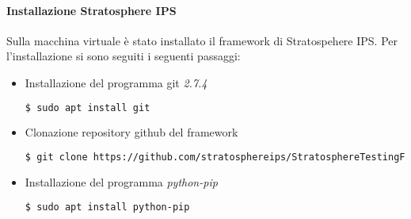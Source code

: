 \documentclass[11pt,a4paper,twoside,openright]{book}
\begin{document}
\paragraph{Installazione Stratosphere IPS}
Sulla macchina virtuale è stato installato il framework di Stratospehere IPS. Per l'installazione si sono seguiti i seguenti passaggi:

\begin{itemize}
				\item Installazione del programma git \textit{2.7.4}
\begin{lstlisting}[language=bash]
$ sudo apt install git
\end{lstlisting}

				\item Clonazione repository github del framework
\begin{lstlisting}[language=bash]
$ git clone https://github.com/stratosphereips/StratosphereTestingFramework
\end{lstlisting}

				\item Installazione del programma \textit{python-pip}
\begin{lstlisting}[language=bash]
$ sudo apt install python-pip
\end{lstlisting}
\end{itemize}
				
\end{document}

